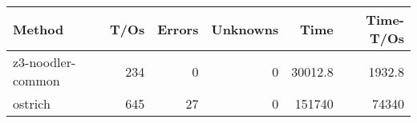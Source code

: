 \begin{tabular}{lrrrrr}
\hline
 Method            &   T/Os &   Errors &   Unknowns &     Time &   Time-T/Os \\
\hline
 z3-noodler-common &    234 &        0 &          0 &  30012.8 &      1932.8 \\
 ostrich           &    645 &       27 &          0 & 151740   &     74340   \\
\hline
\end{tabular}
